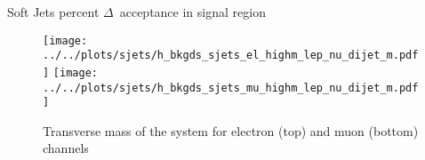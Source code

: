 \documentclass{article}
\begin{document}
\begin{table}[htbp]
  \centering
  \caption{Soft Jets percent $\Delta$~acceptance in signal region}
\end{table}


\begin{figure}[h]
  \centering
  \texttt{[image: ../../plots/sjets/h\_bkgds\_sjets\_el\_highm\_lep\_nu\_dijet\_m.pdf]}
  \texttt{[image: ../../plots/sjets/h\_bkgds\_sjets\_mu\_highm\_lep\_nu\_dijet\_m.pdf]}
  
  \caption{Transverse mass of the system for electron (top) and muon (bottom) channels}
\end{figure}
\end{document}
